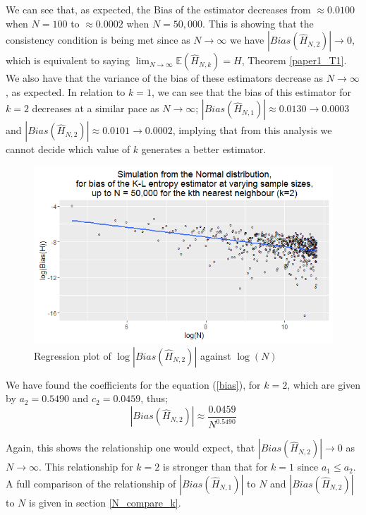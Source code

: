\documentclass{article}
\begin{document}
We can see that, as expected, the Bias of the estimator decreases from $\approx 0.0100$ when $N=100$ to $\approx 0.0002$ when $N=50,000$. This is showing that the consistency condition is being met since as $N \to \infty$ we have $|Bias(\hat{H}_{N, 2})| \to 0$, which is equivalent to saying $\lim_{N \to \infty} \mathbb{E} (\hat{H}_{N, k}) = H$, Theorem \ref{paper1_T1}. We also have that the variance of the bias of these estimators decrease as $N \to \infty$, as expected. In relation to $k=1$, we can see that the bias of this estimator for $k=2$ decreases at a similar pace as $N \to \infty$; $|Bias(\hat{H}_{N, 1})| \approx 0.0130 \to 0.0003$ and $|Bias(\hat{H}_{N, 2})| \approx 0.0101 \to 0.0002$, implying that from this analysis we cannot decide which value of $k$ generates a better estimator.

\begin{figure}
  \begin{center}
    \includegraphics[width=\textwidth]{./Graphs/new_normal_k=2.png}
  \end{center}
\caption{Regression plot of $\log|Bias(\hat{H}_{N, 2})|$ against $\log(N)$}
  \label{normal_k=2_graph}
\end{figure}

We have found the coefficients for the equation (\ref{bias}), for $k=2$, which are given by $a_{2} = 0.5490$ and $c_{2} = 0.0459$, thus;
\begin{equation}
|Bias(\hat{H}_{N, 2})| \approx \frac{0.0459}{N^{0.5490}} \nonumber
\end{equation}

Again, this shows the relationship one would expect, that $|Bias(\hat{H}_{N, 2})| \to 0$ as $N \to \infty$. This relationship for $k=2$ is stronger than that for $k=1$ since $a_{1} \leq a_{2}$. A full comparison of the relationship of $|Bias(\hat{H}_{N, 1})|$ to $N$ and $|Bias(\hat{H}_{N, 2})|$ to $N$ is given in section \ref{N_compare_k}.
\end{document}
